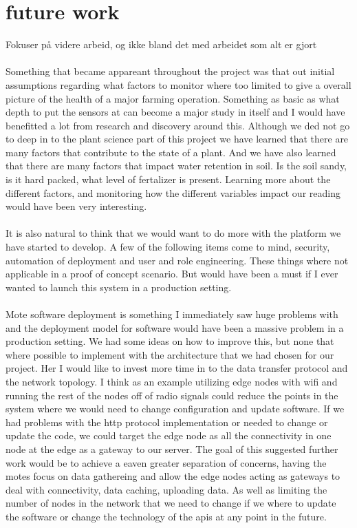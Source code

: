 \documentclass[]{uiophd}
\begin{document}
\section{future work}
Fokuser på videre arbeid, og ikke bland det med arbeidet som alt er gjort
\\\\
Something that became appareant throughout the project was that out initial assumptions regarding what factors to monitor where too limited to give  a overall picture of the health of a major farming operation. Something as basic as what depth to put the sensors at can become a  major study in itself and I would have benefitted a lot from research and discovery around this. Although we ded not go to deep in to the plant science part of this project we have learned that there are many factors that contribute to the state of a plant. And we have also learned that there are many factors that impact water retention in soil. Is the soil sandy, is it hard packed, what level of fertalizer is present. Learning more about the different factors, and monitoring how the different variables impact our reading would have been very interesting.
\\\\
It is also natural to think that we would want to do more with the platform we have started to develop. A few of the following items come to mind, security, automation of deployment and user and role engineering. These things where not applicable in a proof of concept scenario. But would have been a must if I ever wanted to  launch this system in a production setting.
\\\\
Mote software deployment is something I immediately saw huge problems with and the deployment model for software would have been a massive problem in a production setting. We had some ideas on how to improve this, but none that where possible to implement with the architecture that we had chosen for our project. Her I would like to invest more time in to the data transfer protocol and the network topology. I think as an example utilizing edge nodes with wifi and running the rest of the nodes off of radio signals could reduce the points in the system where we would need to change configuration and update software. If we had problems with the http protocol implementation or needed to change or update the code, we could target the edge node as all the connectivity in one node at the edge as a gateway to our server. The goal of this suggested further work would be to achieve a eaven greater separation of concerns, having the motes focus on data gathereing and allow the edge nodes acting as gateways to deal with connectivity, data caching, uploading data. As well as limiting the number of nodes in the network that we need to change if we where to update the software or change the technology of the apis at any point in the future.
\end{document}
